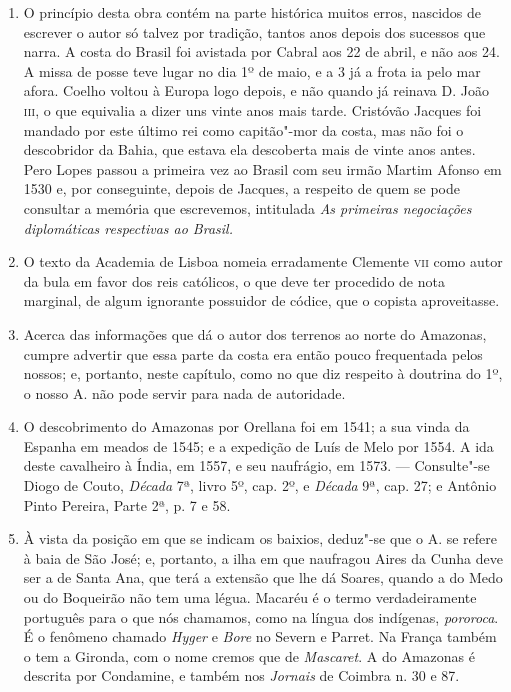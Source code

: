 \begin{enumerate}
\item  O princípio desta obra contém na parte histórica muitos erros, nascidos de escrever o 
autor só talvez por tradição, tantos anos depois dos sucessos que narra. A costa do 
Brasil foi avistada por Cabral aos 22 de abril, e não aos 24. A missa de posse teve lugar 
no dia 1º de maio, e a 3 já a frota ia pelo mar afora. Coelho voltou à Europa logo 
depois, e não quando já reinava D. João \textsc{iii}, o que equivalia a dizer uns vinte anos mais 
tarde. Cristóvão Jacques foi mandado por este último rei como capitão"-mor da costa, 
mas não foi o descobridor da Bahia, que estava ela descoberta mais de vinte anos antes. 
Pero Lopes passou a primeira vez ao Brasil com seu irmão Martim Afonso em 1530 e, 
por conseguinte, depois de Jacques, a respeito de quem se pode consultar a memória 
que escrevemos, intitulada \textit{As primeiras negociações diplomáticas respectivas ao Brasil.}

\item O texto da Academia de Lisboa nomeia erradamente Clemente \textsc{vii} como autor da 
bula em favor dos reis católicos, o que deve ter procedido de nota marginal, de algum 
ignorante possuidor de códice, que o copista aproveitasse.

\item Acerca das informações que dá o autor dos terrenos ao norte do Amazonas, cumpre 
advertir que essa parte da costa era então pouco frequentada pelos nossos; e, portanto, 
neste capítulo, como no que diz respeito à doutrina do 1º, o nosso A. não pode servir 
para nada de autoridade.

\item O descobrimento do Amazonas por Orellana foi em 1541; a sua vinda da Espanha em 
meados de 1545; e a expedição de Luís de Melo por 1554. A ida deste cavalheiro à Índia, 
em 1557, e seu naufrágio, em 1573. --- Consulte"-se Diogo de Couto, 
\textit{Década} 7ª, livro 5º, cap. 2º, e \textit{Década} 9ª, cap. 27; e Antônio Pinto Pereira, Parte 
2ª, p. 7 e 58.

\item  À vista da posição em que se indicam os baixios, deduz"-se que o A.
se refere à baia de São José; e, portanto, a ilha em que naufragou Aires
da Cunha deve ser a de Santa Ana, que terá a extensão que lhe dá Soares,
quando a do Medo ou do Boqueirão não tem uma légua. Macaréu é o termo verdadeiramente português para o que nós chamamos, como na 
língua dos indígenas, \textit{pororoca}. É o fenômeno chamado \textit{Hyger} e \textit{Bore} no Severn e Parret. 
Na França também o tem a Gironda, com o nome cremos que de \textit{Mascaret}. A do Amazonas 
é descrita por Condamine, e também nos \textit{Jornais} de Coimbra n. 30 e 87.


\end{enumerate}
